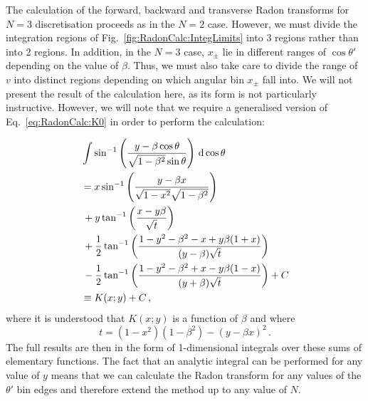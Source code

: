 The calculation of the forward, backward and transverse Radon transforms for $N=3$ discretisation proceeds as in the $N=2$ case. However, we must divide the integration regions of Fig.~\ref{fig:RadonCalc:IntegLimits} into 3 regions rather than into 2 regions. In addition, in the $N=3$ case, $x_\pm$ lie in different ranges of $\cos\theta'$ depending on the value of $\beta$. Thus, we must also take care to divide the range of $v$ into distinct regions depending on which angular bin $x_\pm$ fall into. We will not present the result of the calculation here, as its form is not particularly instructive. However, we will note that we require a generalised version of Eq.~\ref{eq:RadonCalc:K0} in order to perform the calculation:

\begin{align}
&\int \sin^{-1}\left(\frac{y -\beta\cos\theta}{\sqrt{1-\beta^2}\sin\theta}\right) \,\mathrm{d}\cos\theta \notag\\
&= x \sin^{-1}\left(\frac{y-\beta x}{\sqrt{1-x^2}\sqrt{1-\beta^2}}\right) \notag\\
&\, + y \tan^{-1}\left(\frac{x-y\beta}{\sqrt{t}}\right) \notag\\
&\, + \frac{1}{2} \tan^{-1}\left(\frac{1 - y^2 - \beta^2 - x + y\beta(1+x)}{(y-\beta) \sqrt{t}}\right) \notag\\
&\, - \frac{1}{2} \tan^{-1}\left(\frac{1 - y^2 - \beta^2 + x - y\beta(1-x)}{(y+\beta) \sqrt{t}}\right) + C \notag\\
&\equiv K(x;y) + C\,,
\end{align}
where it is understood that $K(x;y)$ is a function of $\beta$ and where
\begin{equation}
t = (1-x^2)(1-\beta^2) - (y - \beta x)^2\,.
\end{equation}
The full results are then in the form of 1-dimensional integrals over these sums of elementary functions. The fact that an analytic integral can be performed for any value of $y$ means that we can calculate the Radon transform for any values of the $\theta'$ bin edges and therefore extend the method up to any value of $N$.

